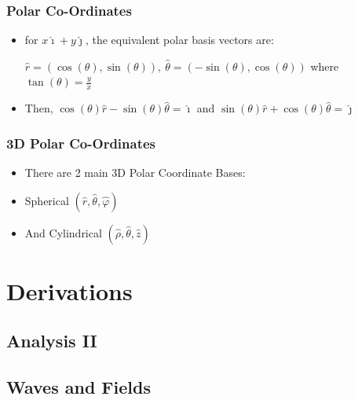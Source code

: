 \documentclass{article}
\begin{document}
\subsubsection*{Polar Co-Ordinates}
\begin{itemize}
    \item for \(x\hat{\imath} + y\hat{\jmath}\), the equivalent polar basis vectors are:
    
    \(\hat{r} = (\cos(\theta), \sin(\theta)), \:\hat{\theta} = (-\sin(\theta), \cos(\theta))\)
    where \(\tan(\theta) = \frac{y}{x}\)
    \item Then, \(\cos(\theta)\hat{r} - \sin(\theta) \hat{\theta} = \hat{\imath}\)
    and \(\sin(\theta)\hat{r} + \cos(\theta)\hat{\theta} = \hat{\jmath}\)
\end{itemize}

\subsubsection*{3D Polar Co-Ordinates}
\begin{itemize}
    \item There are 2 main 3D Polar Coordinate Bases:
    \item Spherical \((\hat r, \hat\theta, \hat\varphi)\)
    \item And Cylindrical \((\hat\rho, \hat\theta, \hat z)\)
\end{itemize}





\newpage

\newcommand{\eqnsubsection}[1]{
    \stepcounter{subsubsection}
    \subsubsection*{eqn \arabic{subsection}.\arabic{subsubsection} #1}
    }


\section{Derivations}
\subsection{Analysis II}
\subsection{Waves and Fields}
\end{document}
